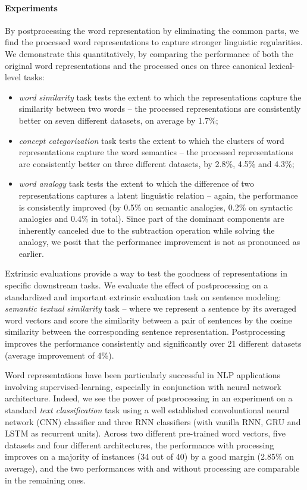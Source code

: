 \documentclass{article} \usepackage{acl2017,times}
\begin{document}
\paragraph{Experiments} By postprocessing the word representation by eliminating the common parts, we find the processed word representations to capture stronger linguistic regularities. We demonstrate this  quantitatively, by comparing the performance of both the original word representations and the processed ones on three canonical lexical-level tasks: 
\begin{itemize}\item {\em word similarity} task tests the extent to which the representations capture the similarity between two words -- the processed representations are consistently better on seven different datasets, on average by 1.7\%; 
\item {\em concept categorization} task  tests the extent to which the clusters of word representations capture the word semantics -- the processed representations are consistently better on three different datasets, by 2.8\%, 4.5\% and 4.3\%; 
\item {\em word analogy} task  tests the extent to which the difference of two representations captures a latent linguistic relation -- again, the performance is consistently improved (by 0.5\% on semantic analogies, 0.2\% on  syntactic analogies and 0.4\% in total). Since part of the dominant components are inherently canceled due to the subtraction operation while solving the analogy, we posit that the performance improvement is not as pronounced as earlier. 
\end{itemize}

Extrinsic evaluations provide a way to test the goodness of representations in specific downstream tasks. We evaluate the effect of postprocessing on a standardized and important extrinsic evaluation task on  sentence modeling: 
 {\em semantic textual similarity} task -- where we represent a sentence by its averaged word vectors and score the similarity between a pair of sentences by the cosine similarity between the corresponding sentence representation.  Postprocessing improves the performance consistently and significantly  over 21 different datasets (average  improvement of 4\%). 
 
 
Word representations have been particularly successful in NLP applications involving supervised-learning, especially in conjunction with neural network architecture. Indeed, we see the power of postprocessing in an experiment on a standard {\em text classification} task using a well established convoluntional neural network (CNN) classifier \citep{kim2014convolutional} and three RNN classifiers (with vanilla RNN, GRU \citep{chung2015gated} and LSTM \cite{greff2016lstm}  as recurrent units).  Across two different pre-trained word vectors, five datasets and four different architectures, the performance with processing improves on a majority of instances (34 out of 40) by a good margin (2.85\% on average), and the two performances with and without processing are comparable in the remaining ones. 
\end{document}
